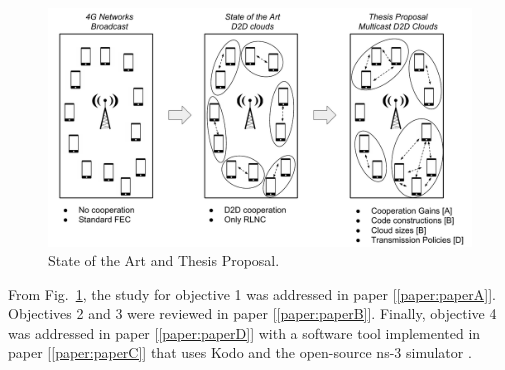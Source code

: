 \begin{figure}[h]
  \centering
  \includegraphics[width=\textwidth]{introduction/figures/thesis-diagrams.pdf}
  \caption{State of the Art and Thesis Proposal.}
\label{fig:proposal}
\end{figure}

From Fig.~\ref{fig:proposal}, the study for objective 1 was addressed in paper {[\ref{paper:paperA}]}. Objectives 2 and 3 were reviewed in paper {[\ref{paper:paperB}]}. Finally, objective 4 was addressed in paper {[\ref{paper:paperD}]} with a software tool implemented in paper {[\ref{paper:paperC}]} that uses Kodo and the open-source ns-3 simulator \cite{ns3link}.

\clearpage
